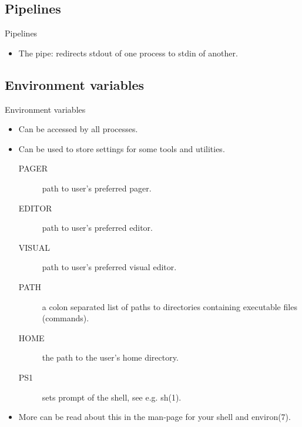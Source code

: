 \documentclass[handout]{beamer}
\begin{document}
\subsection{Pipelines}

\begin{frame}[fragile]{Pipelines}
	\begin{itemize}
		\item The pipe: redirects stdout of one process to stdin of another.
	\end{itemize}
\end{frame}

\subsection{Environment variables}

\begin{frame}{Environment variables}
	\begin{itemize}
		\item<1> Can be accessed by all processes.

		\item<2> Can be used to store settings for some tools and utilities.
			\begin{description}
				\item[PAGER] path to user's preferred pager.
				\item[EDITOR] path to user's preferred editor.
				\item[VISUAL] path to user's preferred visual editor.
				\item[PATH] a colon separated list of paths to directories containing 
					executable files (commands).
				\item[HOME] the path to the user's home directory.
				\item[PS1] sets prompt of the shell, see e.g. sh(1).
			\end{description}

		\item<3> More can be read about this in the man-page for your shell and 
			environ(7).

	\end{itemize}
\end{frame}
\end{document}
